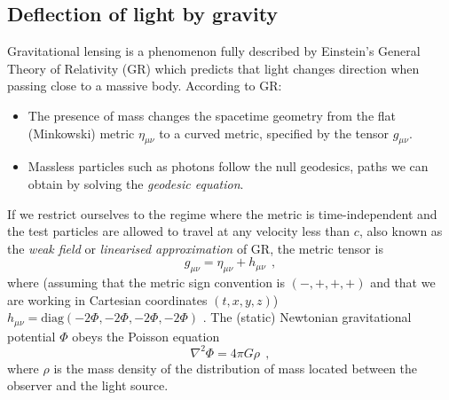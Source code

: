 \documentclass[12pt,dvipsnames]{report}
\newcommand{\hquad}{~~}
\begin{document}
\subsection{Deflection of light by gravity}
Gravitational lensing is a phenomenon fully described by Einstein's General
Theory of Relativity (GR) which predicts that light changes direction 
when passing close to a massive body. According to GR:
\begin{itemize}
    \item The presence of mass changes the spacetime geometry from the flat (Minkowski)
          metric $\eta_{\mu\nu}$ to a curved metric, specified by the tensor $g_{\mu\nu}$.
    \item Massless particles such as photons follow the null geodesics, paths we can obtain by solving the
          \emph{geodesic equation}.
\end{itemize}
If we restrict ourselves to the regime where the metric is time-independent
and the test particles are allowed to travel at any velocity less than $c$,
also known as the \emph{weak field} or \emph{linearised approximation }
of GR, the metric tensor is
\begin{equation}
    g_{\mu\nu}=\eta_{\mu\nu}+h_{\mu\nu}
    \hquad,
\end{equation}
where  (assuming that the metric sign convention is $(-,+,+,+)$ and that we are working in Cartesian coordinates
$(t, x,y,z)$) 
$h_{\mu\nu}=
    \textrm{diag}(-2\Phi,-2\Phi,-2\Phi,-2\Phi)$  \citep{carroll_2019}.
The (static) Newtonian gravitational potential $\Phi$ obeys the Poisson equation
\begin{equation}
    \nabla^2\Phi=4\pi G\rho
    \hquad,
\end{equation}
where $\rho$ is the mass density of the distribution of mass located between the observer
and the light source.
\end{document}
